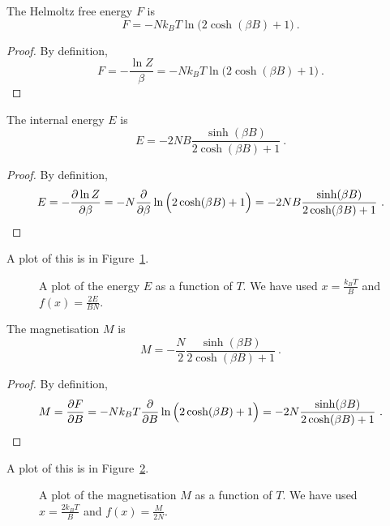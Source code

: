     The Helmoltz free energy $F$ is 
    \begin{equation*}
        F = - N k_B T \ln \Big ( 2 \cosh (\beta B) + 1 \Big) ~.
    \end{equation*}
    \begin{proof}
        By definition, 
        \begin{equation*}
            F = - \frac{\ln Z}{\beta} = - N k_B T \ln \Big ( 2 \cosh (\beta B) + 1 \Big) ~.
        \end{equation*}
    \end{proof}

    The internal energy $E$ is 
    \begin{equation*}
        E = - 2 N B \frac{\sinh (\beta B)}{2 \cosh (\beta B) + 1} ~.
    \end{equation*}
    \begin{proof}
        By definition, 
        \begin{equation*}
            E = - \frac{\partial\ln Z}{\partial\beta} = - N \frac{\partial}{\partial\beta} \ln \Big ( 2 \cosh (\beta B) + 1 \Big) = - 2 N B \frac{\sinh (\beta B)}{2 \cosh (\beta B) + 1} ~.
        \end{equation*}
    \end{proof}
    A plot of this is in Figure~\ref{qm:e1}.
    \begin{figure}
        \centering
        \caption{A plot of the energy $E$ as a function of $T$. We have used $x = \frac{k_B T}{B} $ and $f(x) = \frac{2E}{BN}$.}
        \label{qm:e1}
    \end{figure}

    The magnetisation $M$ is 
    \begin{equation*}
        M = - \frac{N}{2} \frac{\sinh (\beta B)}{2 \cosh (\beta B) + 1} ~. 
    \end{equation*}
    \begin{proof}
        By definition, 
        \begin{equation*}
            M = \frac{\partial F}{\partial B} = - N k_B T \frac{\partial}{\partial B} \ln \Big ( 2 \cosh (\beta B) + 1 \Big) = - 2 N \frac{\sinh (\beta B)}{2 \cosh (\beta B) + 1}  ~.
        \end{equation*}
    \end{proof}
    A plot of this is in Figure~\ref{qm:m2}.
    \begin{figure}
        \centering
        \caption{A plot of the magnetisation $M$ as a function of $T$. We have used $x = \frac{2 k_B T}{B} $ and $f(x) = \frac{M}{2N}$.}
        \label{qm:m2}
    \end{figure}

